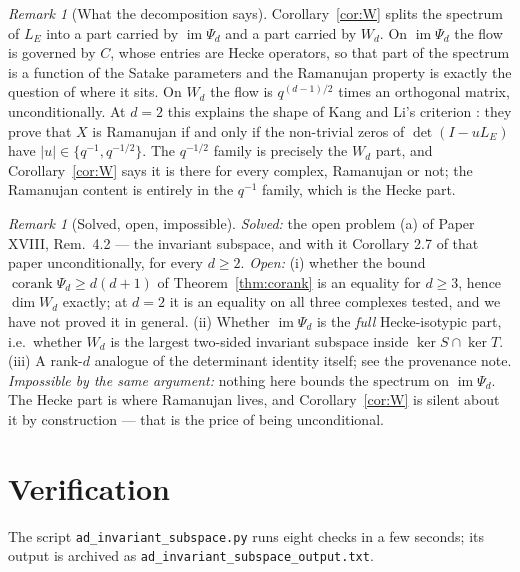 \documentclass[11pt]{amsart}
\theoremstyle{plain}
\theoremstyle{definition}
\theoremstyle{remark}
\newtheorem{remark}[theorem]{Remark}
\newcommand{\LE}{L_E}
\newcommand{\im}{\operatorname{im}}
\begin{document}
\begin{remark}[What the decomposition says]\label{rem:split}
Corollary~\ref{cor:W} splits the spectrum of $\LE$ into a part carried by $\im\Psi_d$ and a
part carried by $W_d$. On $\im\Psi_d$ the flow is governed by $C$, whose entries are Hecke
operators, so that part of the spectrum is a function of the Satake parameters and the
Ramanujan property is exactly the question of where it sits. On $W_d$ the flow is
$q^{(d-1)/2}$ times an orthogonal matrix, unconditionally. At $d=2$ this explains the shape
of Kang and Li's criterion \cite[Thm.~1.0.2]{KL14}: they prove that $X$ is Ramanujan if and
only if the non-trivial zeros of $\det(I-u\LE)$ have $|u|\in\{q^{-1},q^{-1/2}\}$. The
$q^{-1/2}$ family is precisely the $W_d$ part, and Corollary~\ref{cor:W} says it is there for
every complex, Ramanujan or not; the Ramanujan content is entirely in the $q^{-1}$ family,
which is the Hecke part.
\end{remark}

\begin{remark}[Solved, open, impossible]\label{rem:soi}
\emph{Solved:} the open problem (a) of Paper XVIII, Rem.~4.2 --- the invariant subspace, and
with it Corollary 2.7 of that paper unconditionally, for every $d\ge2$.
\emph{Open:} (i) whether the bound $\operatorname{corank}\Psi_d\ge d(d+1)$ of
Theorem~\ref{thm:corank} is an equality for $d\ge3$, hence $\dim W_d$ exactly; at $d=2$ it is
an equality on all three complexes tested, and we have not proved it in general.
(ii) Whether $\im\Psi_d$ is the \emph{full} Hecke-isotypic part, i.e.\ whether $W_d$ is the
largest two-sided invariant subspace inside $\ker S\cap\ker T$.
(iii) A rank-$d$ analogue of the determinant identity itself; see the provenance note.
\emph{Impossible by the same argument:} nothing here bounds the spectrum on $\im\Psi_d$. The
Hecke part is where Ramanujan lives, and Corollary~\ref{cor:W} is silent about it by
construction --- that is the price of being unconditional.
\end{remark}

\section{Verification}

The script \texttt{ad\_invariant\_subspace.py} runs eight checks in a few seconds; its
output is archived as \texttt{ad\_invariant\_subspace\_output.txt}.
\end{document}
